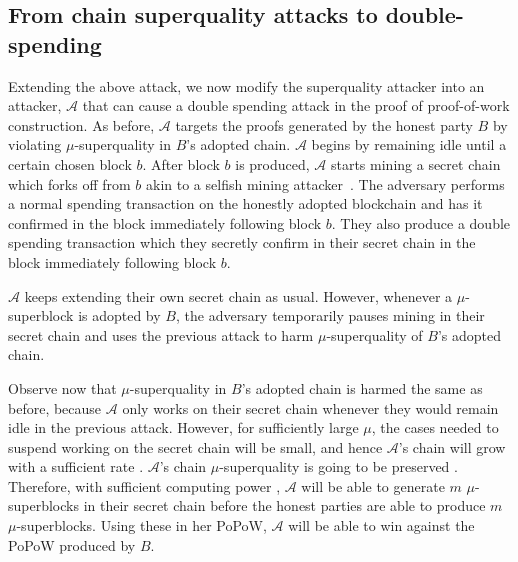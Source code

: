 \subsection{From chain superquality attacks to double-spending}


Extending the above attack, we now modify the superquality attacker into an
attacker, $\mathcal{A}$ that can cause a double spending attack in the proof of
proof-of-work construction. As before, $\mathcal{A}$ targets the proofs
generated by the honest party $B$ by violating $\mu$-superquality in $B$'s
adopted chain. $\mathcal{A}$ begins by remaining idle until a certain chosen
block $b$. After block $b$ is produced, $\mathcal{A}$ starts mining a secret
chain which forks off from $b$ akin to a selfish mining attacker~\cite{selfish}.
The adversary performs a normal spending transaction on the honestly adopted
blockchain and has it confirmed in the block immediately following block $b$.
They also produce a double spending transaction which they secretly confirm in
their secret chain in the block immediately following block $b$.

$\mathcal{A}$ keeps extending their own secret chain as usual. However, whenever
a $\mu$-superblock is adopted by $B$, the adversary temporarily pauses mining in
their secret chain and uses the previous attack to harm $\mu$-superquality of
$B$'s adopted chain.

Observe now that $\mu$-superquality in $B$'s adopted chain is harmed the same as
before, because $\mathcal{A}$ only works on their secret chain whenever they
would remain idle in the previous attack. However, for sufficiently large $\mu$,
the cases needed to suspend working on the secret chain will be small, and hence
$\mathcal{A}$'s chain will grow with a sufficient rate . $\mathcal{A}$'s chain $\mu$-superquality is going to be preserved
. Therefore, with sufficient computing power
, $\mathcal{A}$ will be able to generate
$m$ $\mu$-superblocks in their secret chain before the honest parties are able
to produce $m$ $\mu$-superblocks. Using these in her PoPoW, $\mathcal{A}$ will
be able to win against the PoPoW produced by $B$.

